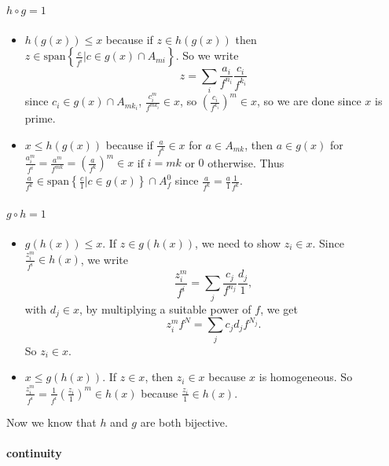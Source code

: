 \documentclass[11pt]{article}
\begin{document}
    \hypertarget{hcirc-g1}{%
\paragraph{\texorpdfstring{\(h\circ g=1\)}{h\textbackslash circ g=1}}\label{hcirc-g1}}

\begin{itemize}
\item
  \(h(g(x))\le x\) because if \(z\in h(g(x))\) then
  \(z\in\mathrm{span}\left\{\frac c{f^i}|c\in g(x)\cap A_{mi}\right\}\).
  So we write \[
  z=\sum_i \frac{a_i}{f^{n_i}}\frac{c_i}{f^{k_i}}
  \] since \(c_i\in g(x)\cap A_{mk_i}\),
  \(\frac{c_i^m}{f^{mk_i}}\in x\), so
  \(\left(\frac{c_i}{f^{k_i}}\right)^m\in x\), so we are done since
  \(x\) is prime.
\item
  \(x\le h(g(x))\) because if \(\frac{a}{f^k} \in x\) for
  \(a\in A_{mk}\), then \(a\in g(x)\) for
  \(\frac{a_i^m}{f^i}=\frac{a^m}{f^{mk}}=\left(\frac{a}{f^k}\right)^m\in x\)
  if \(i=mk\) or \(0\) otherwise. Thus
  \(\frac{a}{f^k}\in\mathrm{span}\left\{\frac c1|c \in g(x)\right\}\cap A^0_f\)
  since \(\frac{a}{f^k}=\frac a 1\frac1{f^k}\).
\end{itemize}

    \hypertarget{gcirc-h1}{%
\paragraph{\texorpdfstring{\(g\circ h=1\)}{g\textbackslash circ h=1}}\label{gcirc-h1}}

\begin{itemize}
\item
  \(g(h(x))\le x\). If \(z\in g(h(x))\), we need to show \(z_i\in x\).
  Since \(\frac{z_i^m}{f^i}\in h(x)\), we write \[
  \frac{z_i^m}{f^i}=\sum_j\frac{c_j}{f^{n_j}}\frac{d_j}1,
  \] with \(d_j\in x\), by multiplying a suitable power of \(f\), we get
  \[
  z_i^mf^N=\sum_jc_jd_jf^{N_j}.
  \] So \(z_i\in x\).
\item
  \(x\le g(h(x))\). If \(z\in x\), then \(z_i\in x\) because \(x\) is
  homogeneous. So
  \(\frac{z_i^m}{f^i}=\frac1{f^i}\left(\frac{z_i}1\right)^m\in h(x)\)
  because \(\frac{z_i}1\in h(x)\).
\end{itemize}

Now we know that \(h\) and \(g\) are both bijective.

    \hypertarget{continuity}{%
\paragraph{continuity}\label{continuity}}
\end{document}
